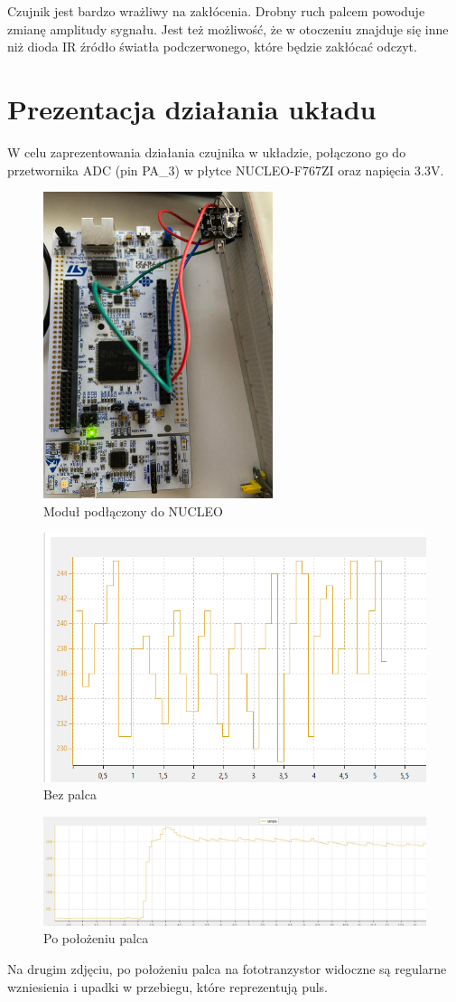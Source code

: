 \documentclass[11pt, a4paper]{article}
\begin{document}
Czujnik jest bardzo wrażliwy na zakłócenia. Drobny ruch palcem powoduje zmianę amplitudy sygnału. Jest też możliwość, że w otoczeniu znajduje się inne niż dioda IR źródło światła podczerwonego, które będzie zakłócać odczyt.

\section{Prezentacja działania układu}
W celu zaprezentowania działania czujnika w układzie, połączono go do przetwornika ADC (pin PA\_3) w płytce NUCLEO-F767ZI oraz napięcia 3.3V. 

\begin{figure}[h]
    \centering
    \includegraphics[width=0.6\textwidth]{fig/KY-039/działanie_ukladu/zdj3.jpg}
    \caption{Moduł podłączony do NUCLEO}
    \label{fig:my_label}
\end{figure}

\newpage
\vspace{0.5cm}
\begin{figure}[h]
  \centering
  \includegraphics[width=.6\linewidth]{fig/KY-039/działanie_ukladu/adc_bezpalca.png}
  \caption{Bez palca}
\end{figure}
\begin{figure}[h]
  \centering
    \includegraphics[width=.6\textwidth]{fig/KY-039/działanie_ukladu/adc_zpalcem.png}
      \caption{Po położeniu palca }
\end{figure}
\vspace{0.5cm}

Na drugim zdjęciu, po położeniu palca na fototranzystor widoczne są regularne wzniesienia i upadki w przebiegu, które reprezentują puls. 
\newpage
\printbibliography[heading=bibintoc]
\end{document}
